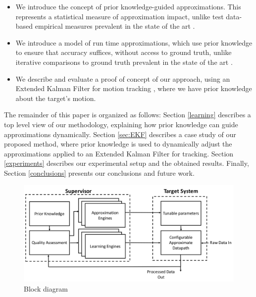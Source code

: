 \begin{itemize}
\item	We introduce the concept of prior knowledge-guided approximations. This represents a statistical measure of approximation impact, unlike test data-based empirical measures prevalent in the state of the art \cite{zhang2014approxit}.
\item	We introduce a model of run time approximations, which use prior knowledge to ensure that accuracy suffices, without access to ground truth, unlike iterative comparisons to ground truth prevalent in the state of the art \cite{han2013approximate}.
\item 	We describe and evaluate a proof of concept of our approach, using an Extended Kalman Filter for motion tracking \cite{kulikov2016accurate}, where we have prior knowledge about the target's motion. 
\end{itemize}

\par The remainder of this paper is organized as follows: Section \ref{learning} describes a top level view of our methodology, explaining how prior knowledge can guide approximations dynamically. Section \ref{sec:EKF} describes a case study of our proposed method, where prior knowledge is used to dynamically adjust the approximations applied to an Extended Kalman Filter for tracking. Section \ref{experiments} describes our experimental setup and the obtained results. Finally, Section \ref{conclusions} presents our conclusions and future work. 


\begin{figure}[tb]
  \centering
  \includegraphics[width=\columnwidth]{img/block_diagram.png}
  \caption{Block diagram}
  \label{fig:block_diagram}
\end{figure}
